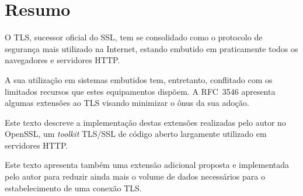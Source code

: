 
\chapter*{Resumo}

\begin{center}

{\Large\bfseries \pfcTitulo}

\end{center}

O TLS, sucessor oficial do SSL, tem se consolidado como o protocolo de segurança
mais utilizado na Internet, estando embutido em praticamente todos os
navegadores e servidores HTTP.

A sua utilização em sistemas embutidos tem, entretanto, conflitado com os
limitados recursos que estes equipamentos dispõem. A RFC~3546
apresenta algumas extensões ao TLS visando minimizar o ônus da sua adoção.

Este texto descreve a implementação destas extensões realizadas pelo autor
no OpenSSL, um \emph{toolkit} TLS/SSL de código aberto largamente utilizado
em servidores HTTP.

Este texto apresenta também uma extensão adicional proposta e implementada 
pelo autor para reduzir ainda mais o volume de dados necessários para o
estabelecimento de uma conexão TLS.

